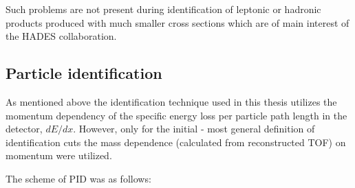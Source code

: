 Such problems are not present during identification of leptonic or hadronic products 
produced with much smaller cross sections which are of main interest of the HADES collaboration.  



\subsection{\label{PID} Particle identification}



As mentioned above the identification technique used in this thesis utilizes the momentum dependency of the specific energy loss 
per particle path length in the detector, $dE/dx$.
However, only for the initial - most general definition of identification cuts the 
mass dependence (calculated from reconstructed TOF) on momentum were utilized.

The scheme of PID was as follows:

